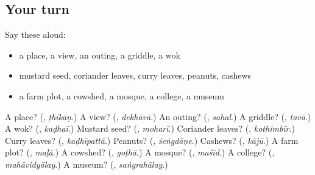 \subsection*{Your turn}
Say these aloud:

\begin{itemize}
\raggedright
  \item a place, a view, an outing, a griddle, a wok
  \item mustard seed, coriander leaves, curry leaves, peanuts, cashews
  \item a farm plot, a cowshed, a mosque, a college, a museum
\end{itemize}

\begin{tcolorbox}[breakable,colback=teal!4,colframe=teal!35!black,title={Before you move on}]
A place? (\textbf{}, \emph{ṭhikāṇ}.) A view? (\textbf{}, \emph{dekhāvā}.) An outing? (\textbf{}, \emph{sahal}.) A griddle? (\textbf{}, \emph{tavā}.) A wok? (\textbf{}, \emph{kaḍhaī}.) Mustard seed? (\textbf{}, \emph{moharī}.) Coriander leaves? (\textbf{}, \emph{kothimbīr}.) Curry leaves? (\textbf{}, \emph{kaḍhīpattā}.) Peanuts? (\textbf{}, \emph{śeṅgdāṇe}.) Cashews? (\textbf{}, \emph{kājū}.) A farm plot? (\textbf{}, \emph{maḷā}.) A cowshed? (\textbf{}, \emph{goṭhā}.) A mosque? (\textbf{}, \emph{maśīd}.) A college? (\textbf{}, \emph{mahāvidyālay}.) A museum? (\textbf{}, \emph{saṅgrahālay}.)
\end{tcolorbox}
